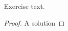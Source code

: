 \documentclass[11pt,a4paper,english,hyperref]{article}
\begin{document}
\maketitle
\begin{aufg}[n Points]
  Exercise text.
\end{aufg}
\begin{proof}
  A solution
\end{proof}
\end{document}
